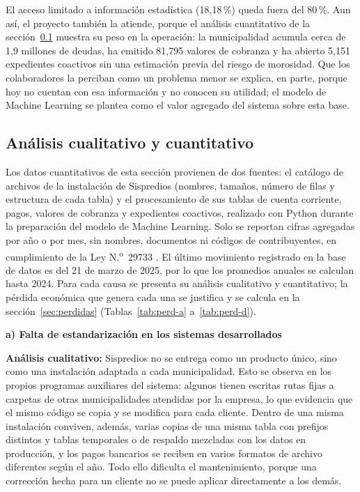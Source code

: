 \documentclass[12pt,a4paper]{report}
\newcommand{\subtitulo}[1]{\par\vspace{4pt}\noindent\textbf{#1}\par}
\begin{document}
El acceso limitado a información estadística (18,18\,\%) queda fuera del 80\,\%. Aun así, el proyecto también la atiende, porque el análisis cuantitativo de la sección~\ref{sec:analisis-cuali-cuanti} muestra su peso en la operación: la municipalidad acumula cerca de 1,9 millones de deudas, ha emitido 81,795 valores de cobranza y ha abierto 5,151 expedientes coactivos sin una estimación previa del riesgo de morosidad. Que los colaboradores la perciban como un problema menor se explica, en parte, porque hoy no cuentan con esa información y no conocen su utilidad; el modelo de Machine Learning se plantea como el valor agregado del sistema sobre esta base.

\subsection{Análisis cualitativo y cuantitativo}
\label{sec:analisis-cuali-cuanti}

Los datos cuantitativos de esta sección provienen de dos fuentes: el catálogo de archivos de la instalación de Sispredios (nombres, tamaños, número de filas y estructura de cada tabla) y el procesamiento de sus tablas de cuenta corriente, pagos, valores de cobranza y expedientes coactivos, realizado con Python durante la preparación del modelo de Machine Learning. Solo se reportan cifras agregadas por año o por mes, sin nombres, documentos ni códigos de contribuyentes, en cumplimiento de la Ley N.\textsuperscript{o}~29733 \parencite{ley29733}. El último movimiento registrado en la base de datos es del 21 de marzo de 2025, por lo que los promedios anuales se calculan hasta 2024. Para cada causa se presenta su análisis cualitativo y cuantitativo; la pérdida económica que genera cada una se justifica y se calcula en la sección~\ref{sec:perdidas} (Tablas~\ref{tab:perd-a} a~\ref{tab:perd-d}).

\subtitulo{a) Falta de estandarización en los sistemas desarrollados}

\noindent\textbf{Análisis cualitativo:} Sispredios no se entrega como un producto único, sino como una instalación adaptada a cada municipalidad. Esto se observa en los propios programas auxiliares del sistema: algunos tienen escritas rutas fijas a carpetas de otras municipalidades atendidas por la empresa, lo que evidencia que el mismo código se copia y se modifica para cada cliente. Dentro de una misma instalación conviven, además, varias copias de una misma tabla con prefijos distintos y tablas temporales o de respaldo mezcladas con los datos en producción, y los pagos bancarios se reciben en varios formatos de archivo diferentes según el año. Todo ello dificulta el mantenimiento, porque una corrección hecha para un cliente no se puede aplicar directamente a los demás.
\end{document}
